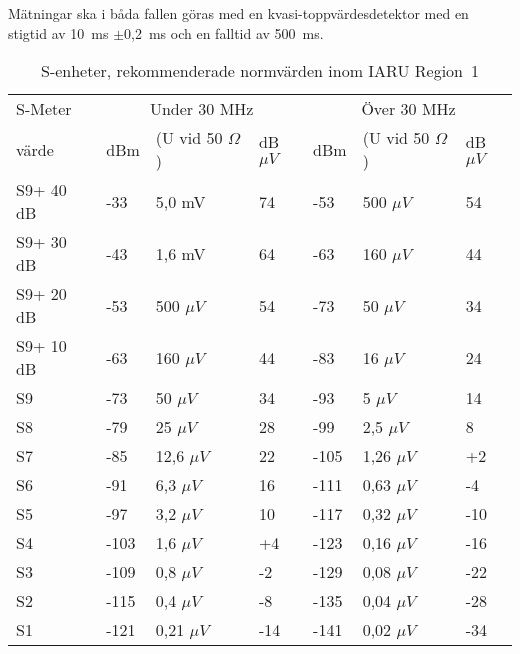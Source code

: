 Mätningar ska i båda fallen göras med en kvasi-toppvärdesdetektor
med en stigtid av 10~ms \(\pm\)0,2~ms och en falltid av 500~ms.

\begin{table}[ht]
  \begin{tabular}{l|lll|lll}
    S-Meter  & \multicolumn{3}{c}{Under 30 MHz} & \multicolumn{3}{c}{Över 30 MHz} \\
    värde    & dBm & (U vid 50 \(\Omega\)) & dB\(\mu V\) & dBm & (U vid 50 \(\Omega\)) & dB\(\mu V\) \\
    \hline
    S9+ 40 dB & -33  & 5,0 mV  & 74  & -53  & 500 \(\mu V\) & 54  \\
    S9+ 30 dB & -43  & 1,6 mV  & 64  & -63  & 160 \(\mu V\) & 44  \\
    S9+ 20 dB & -53  & 500 \(\mu V\)  & 54  & -73  & 50 \(\mu V\) & 34  \\
    S9+ 10 dB & -63  & 160 \(\mu V\)  & 44  & -83  & 16 \(\mu V\) & 24  \\
    S9        & -73  & 50 \(\mu V\)   & 34  & -93  & 5 \(\mu V\) & 14  \\
    S8        & -79  & 25 \(\mu V\)   & 28  & -99  & 2,5 \(\mu V\) & 8   \\
    S7        & -85  & 12,6 \(\mu V\) & 22  & -105 & 1,26 \(\mu V\) & +2  \\
    S6        & -91  & 6,3 \(\mu V\)  & 16  & -111 & 0,63 \(\mu V\) & -4  \\
    S5        & -97  & 3,2 \(\mu V\)  & 10  & -117 & 0,32 \(\mu V\) & -10 \\
    S4        & -103 & 1,6 \(\mu V\)  & +4  & -123 & 0,16 \(\mu V\) & -16 \\
    S3        & -109 & 0,8 \(\mu V\)  & -2  & -129 & 0,08 \(\mu V\) & -22 \\
    S2        & -115 & 0,4 \(\mu V\)  & -8  & -135 & 0,04 \(\mu V\) & -28 \\
    S1        & -121 & 0,21 \(\mu V\) & -14 & -141 & 0,02 \(\mu V\) & -34 \\
  \end{tabular}
  \caption{S-enheter, rekommenderade normvärden inom IARU Region~1}
  \label{s-enhet tabell}
\end{table}
